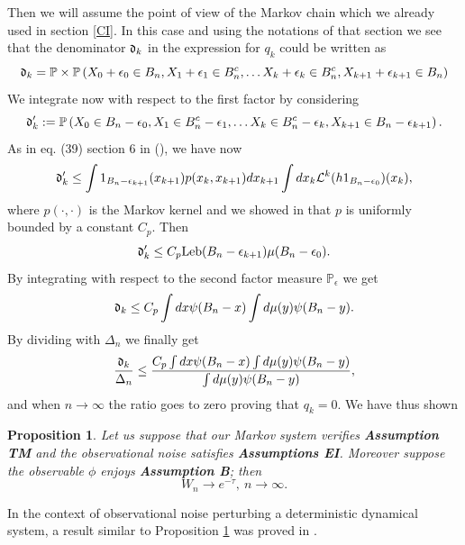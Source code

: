 \documentclass{article}
\newcommand{\1}{\mathbbm{1}}
\newtheorem{proposition}[theorem]{Proposition}
\begin{document}
Then we will  assume the point of view of the Markov chain which we already used in section \ref{CI}. In this case and using the notations of that section we see that the denominator $\frak{d}_k$ in the expression for  $q_k$ could be written as
$$
\frak{d}_k=\mathbb{P}\times\mathbb{P}\left(X_0+\epsilon_0\in B_n, X_1+\epsilon_1\in B^c_n, \dots X_k+\epsilon_k\in B^c_n, X_{k+1}+\epsilon_{k+1}\in B_n\right)
$$
We integrate now with respect to the first factor by considering
$$
\frak{d}'_k:=\mathbb{P}\left(X_0\in B_n-\epsilon_0, X_1\in B^{c}_n-\epsilon_1, \dots X_k\in B^{c}_n-\epsilon_k, X_{k+1}\in B_n-\epsilon_{k+1}\right).
$$
As in eq. (39) section 6 in (\cite{lillo22}), we have now
$$
\frak{d}'_k\le \int 1_{B_n-\epsilon_{k+1}}(x_{k+1})p(x_k, x_{k+1})dx_{k+1}\int dx_k\mathcal{L}^{k}(h1_{ B_n-\epsilon_{0}})(x_k),
$$
where $p(\cdot, \cdot)$ is the Markov kernel and we showed in \cite{lillo22} that $p$ is uniformly bounded by a constant $C_p.$ Then
$$
\frak{d}'_k\le C_p \text{Leb}(B_n-\epsilon_{k+1})\mu( B_n-\epsilon_{0}).
$$
By integrating with respect to the second factor measure $\mathbb{P}_{\epsilon}$ we  get
$$
\frak{d}_k\le C_p \int dx \psi(B_n-x)\int d\mu(y)\psi(B_n-y).
$$
By dividing with $\Delta_n$ we finally get
$$
\frac{\frak{d}_k}{\Delta_n}\le \frac{C_p\int dx \psi(B_n-x)\int d\mu(y)\psi(B_n-y)}{\int d\mu(y)\psi(B_n-y)},
$$
and when $n\rightarrow \infty$ the ratio goes to zero proving that $q_k=0.$
We have thus shown
\begin{proposition}\label{pp1}
Let us suppose that our Markov system verifies {\bf Assumption TM} and the observational noise satisfies {\bf Assumptions EI}. Moreover suppose the observable $\phi$ enjoys {\bf Assumption B}; then 
$$
W_n\rightarrow e^{- \tau}, \ n\rightarrow \infty.
$$
\end{proposition}

  In the context of observational noise perturbing a deterministic dynamical system, a result similar to Proposition \ref{pp1} was proved in \cite{FV}.



\end{document}
